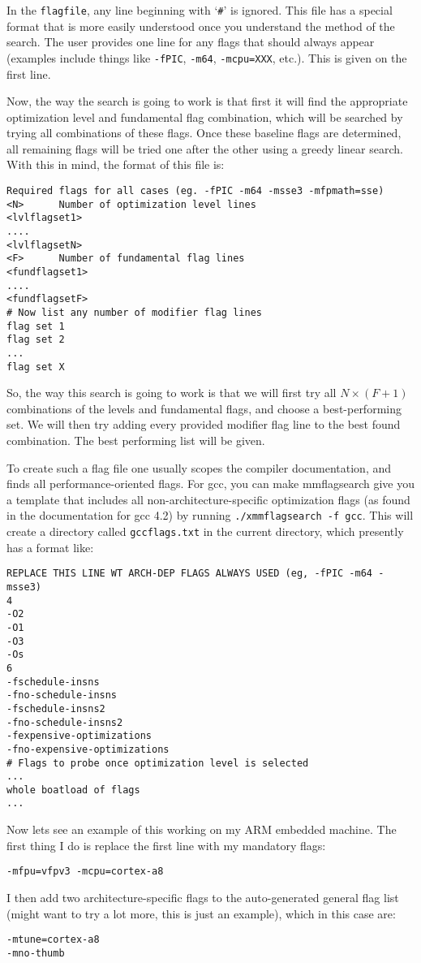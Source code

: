 \documentclass[11pt]{article}
\begin{document}
In the {\tt flagfile}, any line beginning with `\verb+#+' is ignored.
This file has a special format that is more easily understood once 
you understand the method of the search.  The user provides one line
for any flags that should always appear (examples include things like
{\tt -fPIC}, {\tt -m64}, {\tt -mcpu=XXX}, etc.).  This is given on the
first line.

Now, the way the search is going to work is that first it will find
the appropriate optimization level and fundamental flag combination,
which will be searched by trying all combinations of these flags.
Once these baseline flags are determined, all remaining flags will
be tried one after the other using a greedy linear search.
With this in mind, the format of this file is:
\begin{verbatim}
Required flags for all cases (eg. -fPIC -m64 -msse3 -mfpmath=sse)
<N>      Number of optimization level lines
<lvlflagset1>
....
<lvlflagsetN>
<F>      Number of fundamental flag lines
<fundflagset1>
....
<fundflagsetF>
# Now list any number of modifier flag lines
flag set 1
flag set 2
...
flag set X
\end{verbatim}

So, the way this search is going to work is that we will first try all
$N \times (F+1)$ combinations of the levels and fundamental flags, and
choose a best-performing set.  We will then try adding every provided modifier
flag line to the best found combination.  The best performing list will be 
given.  

To create such a flag file one usually scopes the compiler documentation, 
and finds all performance-oriented flags.  For gcc, you can make mmflagsearch
give you a template that includes all non-architecture-specific optimization
flags (as found in the documentation for gcc 4.2)
by running {\tt ./xmmflagsearch -f gcc}.  This will create a directory
called {\tt gccflags.txt} in the current directory, which presently has
a format like:
\begin{verbatim}
REPLACE THIS LINE WT ARCH-DEP FLAGS ALWAYS USED (eg, -fPIC -m64 -msse3)
4
-O2
-O1
-O3
-Os
6
-fschedule-insns 
-fno-schedule-insns 
-fschedule-insns2
-fno-schedule-insns2
-fexpensive-optimizations
-fno-expensive-optimizations
# Flags to probe once optimization level is selected
...
whole boatload of flags
...
\end{verbatim}

Now lets see an example of this working on my ARM embedded machine.  The first
thing I do is replace the first line with my mandatory flags:
\begin{verbatim}
-mfpu=vfpv3 -mcpu=cortex-a8
\end{verbatim}
I then add two architecture-specific flags to the auto-generated general
flag list (might want to try a lot more, this is just an example), 
which in this case are:
\begin{verbatim}
-mtune=cortex-a8
-mno-thumb
\end{verbatim}
\end{document}
